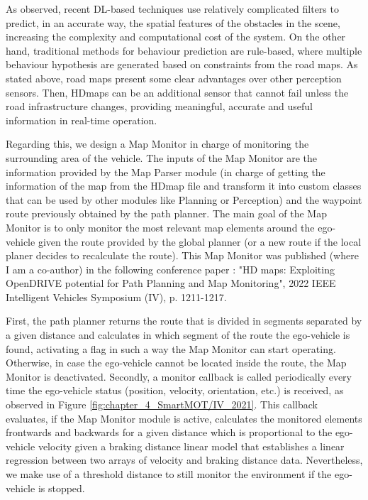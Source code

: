 As observed, recent \ac{DL}-based techniques use relatively complicated filters to predict, in an accurate way, the spatial features of the obstacles in the scene, increasing the complexity and computational cost of the system. On the other hand, traditional methods for behaviour prediction are rule-based, where multiple behaviour hypothesis are generated based on constraints from the road maps. As stated above, road maps present some clear advantages over other perception sensors. Then, \acp{HDmap} can be an additional sensor that cannot fail unless the road infrastructure changes, providing meaningful, accurate and useful information in real-time operation.  

Regarding this, we design a Map Monitor in charge of monitoring the surrounding area of the vehicle. The inputs of the Map Monitor are the information provided by the Map Parser module (in charge of getting the information of the map from the \ac{HDmap} file and transform it into custom classes that can be used by other modules like Planning or Perception) and the waypoint route previously obtained by the path planner. The main goal of the Map Monitor is to only monitor the most relevant map elements around the ego-vehicle given the route provided by the global planner (or a new route if the local planer decides to recalculate the route). This Map Monitor was published (where I am a co-author) in the following conference paper \cite{diaz2022hd}: "HD maps: Exploiting OpenDRIVE potential for Path Planning and Map Monitoring", 2022 IEEE Intelligent Vehicles Symposium (IV), p. 1211-1217. 

First, the path planner returns the route that is divided in segments separated by a given distance and calculates in which segment of the route the ego-vehicle is found, activating a flag in such a way the Map Monitor can start operating. Otherwise, in case the ego-vehicle cannot be located inside the route, the Map Monitor is deactivated. Secondly, a monitor callback is called periodically every time the ego-vehicle status (position, velocity, orientation, etc.) is received, as observed in Figure \ref{fig:chapter_4_SmartMOT/IV_2021}. This callback evaluates, if the Map Monitor module is active, calculates the monitored elements frontwards and backwards for a given distance which is proportional to the ego-vehicle velocity given a braking distance linear model that establishes a linear regression between two arrays of velocity and braking distance data. Nevertheless, we make use of a threshold distance to still monitor the environment if the ego-vehicle is stopped. %


